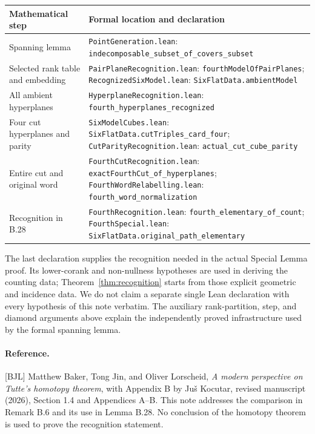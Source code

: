 \documentclass[11pt]{article}
\newcommand{\code}[1]{\nolinkurl{#1}}
\begin{document}
\begin{center}
\renewcommand{\arraystretch}{1.2}
\begin{tabularx}{\textwidth}{@{}p{}X@{}}
\toprule
Mathematical step & Formal location and declaration \\\midrule
Spanning lemma & \code{PointGeneration.lean}: \code{indecomposable_subset_of_covers_subset} \\
Selected rank table and embedding & \code{PairPlaneRecognition.lean}: \code{fourthModelOfPairPlanes}; \code{RecognizedSixModel.lean}: \code{SixFlatData.ambientModel} \\
All ambient hyperplanes & \code{HyperplaneRecognition.lean}: \code{fourth_hyperplanes_recognized} \\
Four cut hyperplanes and parity & \code{SixModelCubes.lean}: \code{SixFlatData.cutTriples_card_four}; \code{CutParityRecognition.lean}: \code{actual_cut_cube_parity} \\
Entire cut and original word & \code{FourthCutRecognition.lean}: \code{exactFourthCut_of_hyperplanes}; \code{FourthWordRelabelling.lean}: \code{fourth_word_normalization} \\
Recognition in B.28 & \code{FourthRecognition.lean}: \code{fourth_elementary_of_count}; \code{FourthSpecial.lean}: \code{SixFlatData.original_path_elementary} \\
\bottomrule
\end{tabularx}
\end{center}

The last declaration supplies the recognition needed in the actual Special Lemma proof. Its lower-corank and non-nullness hypotheses are used in deriving the counting data; Theorem~\ref{thm:recognition} starts from those explicit geometric and incidence data. We do not claim a separate single Lean declaration with every hypothesis of this note verbatim. The auxiliary rank-partition, step, and diamond arguments above explain the independently proved infrastructure used by the formal spanning lemma.

\paragraph{Reference.}
[BJL] Matthew Baker, Tong Jin, and Oliver Lorscheid, \emph{A modern perspective on Tutte's homotopy theorem}, with Appendix B by Ju\v s Kocutar, revised manuscript (2026), Section 1.4 and Appendices A--B. This note addresses the comparison in Remark B.6 and its use in Lemma B.28. No conclusion of the homotopy theorem is used to prove the recognition statement.
\end{document}
